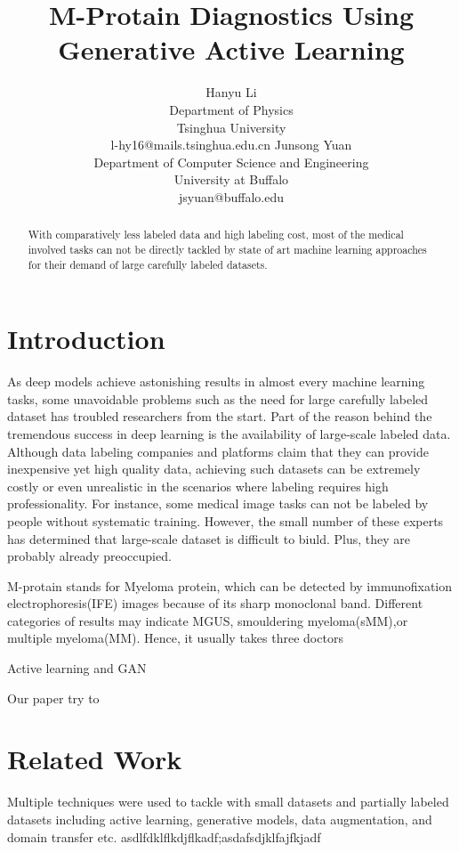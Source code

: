 \documentclass[letterpaper]{article}
\title{M-Protain Diagnostics Using Generative Active Learning}
\author{Hanyu Li\\
Department of Physics\\
Tsinghua University\\
l-hy16@mails.tsinghua.edu.cn
\And
Junsong Yuan\\
Department of Computer Science and Engineering\\
University at Buffalo\\
jsyuan@buffalo.edu}
\begin{document}
\maketitle


\begin{abstract}
    With comparatively less labeled data and high labeling cost, most of the medical involved tasks can not be directly tackled by state of art machine learning approaches for their demand of large carefully labeled datasets.
\end{abstract}


\section{Introduction}
\par As deep models achieve astonishing results in almost every machine learning tasks, some unavoidable problems such as the need for large carefully labeled dataset has troubled researchers from the start. Part of the reason behind the tremendous success in deep learning is the availability of large-scale labeled data\cite{sun2017revisiting}. Although data labeling companies and platforms claim that they can provide inexpensive yet high quality data\cite{buhrmester2011amazon}, achieving such datasets can be extremely costly or even unrealistic in the scenarios where labeling requires high professionality. For instance, some medical image tasks can not be labeled by people without systematic training. However, the small number of these experts has determined that large-scale dataset is difficult to biuld. Plus, they are probably already preoccupied.

M-protain stands for Myeloma protein, which can be detected by immunofixation electrophoresis(IFE) images because of its sharp monoclonal band. Different categories of results may indicate MGUS, smouldering myeloma(sMM),or multiple myeloma(MM). Hence, it usually takes three doctors

Active learning and GAN

Our paper try to 


\section{Related Work}
Multiple techniques were used to tackle with small datasets and partially labeled datasets including active learning\cite{settles2009active}, generative models\cite{goodfellow2014generative}\cite{kingma2013auto}, data augmentation\cite{tanner1987calculation}, and domain transfer\cite{pan2009survey} etc. asdlfdklflkdjflkadf;asdafsdjklfajfkjadf\cite{Zhu2017GenerativeAA}
\end{document}
